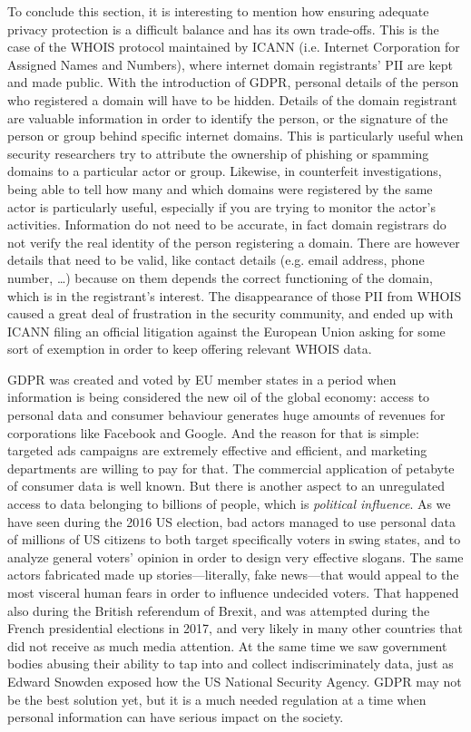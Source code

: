 To conclude this section, it is interesting to mention how ensuring
adequate privacy protection is a difficult balance and has its own trade-offs. This is
the case of the WHOIS protocol maintained by ICANN (i.e. Internet Corporation
for Assigned Names and Numbers), where internet domain registrants' PII are
kept and made public. With the introduction of GDPR, personal details of the
person who registered a domain will have to be hidden. Details of the domain
registrant are valuable information in order to identify the person, or the
signature of the person or group behind specific internet domains. This is
particularly useful when security researchers try to attribute the ownership of
phishing or spamming domains to a particular actor or group. Likewise, in
counterfeit investigations, being able to tell how many and which domains were registered by
the same actor is particularly useful, especially if you are trying to monitor
the actor's activities. Information do not need to be accurate, in fact domain
registrars do not verify the real identity of the person registering a domain.
There are however details that need to be valid, like contact details (e.g.
email address, phone number, \ldots) because on them depends the correct functioning of
the domain, which is in the registrant's interest. The disappearance of those
PII from WHOIS caused a great deal of frustration in the security community, and
ended up with ICANN filing an official litigation against the European Union
asking for some sort of exemption in order to keep offering relevant WHOIS
data.

GDPR was created and voted by EU member states in a period when information is
being considered the new oil of the global economy: access to personal data and
consumer behaviour generates huge amounts of revenues for corporations like
Facebook and Google. And the reason for that is simple: targeted ads campaigns
are extremely effective and efficient, and marketing departments are willing to pay
for that. The commercial application of petabyte of consumer data is well known.
But there is another aspect to an unregulated access to data belonging to
billions of people, which is \emph{political influence}. As we have seen during
the 2016 US election, bad actors managed to use personal data of millions of US
citizens to both target specifically voters in swing states, and to analyze
general voters' opinion in order to design very effective slogans. The same
actors fabricated made up stories---literally, fake news---that would appeal to
the most visceral human fears in order to influence undecided voters. That
happened also during the British referendum of Brexit, and was attempted during
the French presidential elections in 2017, and very likely in many other
countries that did not receive as much media attention. At the same time we
saw government bodies abusing their ability to tap into and collect
indiscriminately data, just as Edward Snowden exposed how the US National
Security Agency. GDPR may not be the best solution yet, but it is a much needed
regulation at a time when personal information can have serious impact on the
society.

